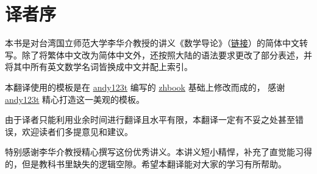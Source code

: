 
\chapter*{译者序}
本书是对台湾国立师范大学李华介教授的讲义《数学导论》（\href{https://math.ntnu.edu.tw/~li/intr.html}{链接}）的简体中文转写。除了将繁体中文改为简体中文外，还按照大陆的语法要求更改了部分表述，并将其中所有英文数学名词皆换成中文并配上索引。

本翻译使用的模板是在 \href{https://github.com/andy123t}{andy123t} 编写的 \href{https://github.com/andy123t/zhbook}{zhbook} 基础上修改而成的，
感谢 \href{https://github.com/andy123t}{andy123t} 精心打造这一美观的模板。

由于译者只能利用业余时间进行翻译且水平有限，本翻译一定有不妥之处甚至错误，欢迎读者们多提意见和建议。

特别感谢李华介教授精心撰写这份优秀讲义。本讲义短小精悍，补充了直觉能习得的，但是教科书里缺失的逻辑空隙。希望本翻译能对大家的学习有所帮助。


